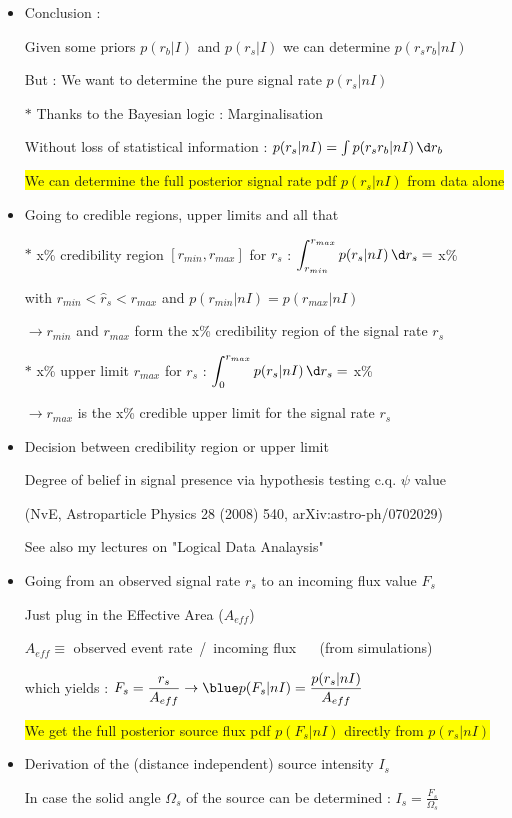 \Tr
\begin{itemize}
\item Conclusion :
\item[] {\blue Given some priors $p(r_{b}|I)$ and $p(r_{s}|I)$ we can determine $p(r_{s}r_{b}|nI)$}
\item[] But : {\red We want to determine the pure signal rate $p(r_{s}|nI)$}
\item[$\ast$] Thanks to the Bayesian logic : {\blue Marginalisation}
\item[] Without loss of statistical information : {\blue $p(r_{s}|nI)=\int p(r_{s}r_{b}|nI)\,\d r_{b}$}
\item[] \colorbox{yellow}{We can determine the full posterior signal rate pdf $p(r_{s}|nI)$ from data alone}
\item {\blue Going to credible regions, upper limits and all that}
\item[$\ast$] x\% credibility region $[r_{min},r_{max}]$ for $r_{s}$ : $\displaystyle \int_{r_{min}}^{r_{max}} p(r_{s}|nI)\,\d r_{s}=$ x\%
\item[] with $r_{min} < \hat{r}_{s} < r_{max}$ and $p(r_{min}|nI)=p(r_{max}|nI)$ 
\item[] $\rightarrow r_{min}$ and $r_{max}$ form the x\% credibility region of the signal rate $r_{s}$
\item[$\ast$] x\% upper limit $r_{max}$ for $r_{s}$ : $\displaystyle \int_{0}^{r_{max}} p(r_{s}|nI)\,\d r_{s}=$ x\%
\item[] $\rightarrow r_{max}$ is the x\% credible upper limit for the signal rate $r_{s}$
\end{itemize}

\Tr
\begin{itemize}
\item {\blue Decision between credibility region or upper limit}
\item[] Degree of belief in signal presence via hypothesis testing c.q. $\psi$ value
\item[] (NvE, Astroparticle Physics 28 (2008) 540, arXiv:astro-ph/0702029)
\item[] See also my lectures on "Logical Data Analaysis" 
\item {\blue Going from an observed signal rate $r_{s}$ to an incoming flux value $F_{s}$}
\item[] Just plug in the {\red Effective Area} ($A_{eff}$)
\item[] $A_{eff} \equiv$ observed event rate~/~incoming flux $\quad$ (from simulations)
\item[] which yields : $\displaystyle F_{s}=\frac{r_{s}}{A_{eff}}
        \rightarrow {\blue p(F_{s}|nI)=\frac{p(r_{s}|nI)}{A_{eff}}}$
\item[] \colorbox{yellow}{We get the full posterior source flux pdf $p(F_{s}|nI)$ directly from $p(r_{s}|nI)$}
\item {\blue Derivation of the (distance independent) source intensity $I_{s}$}
\item[] In case the solid angle $\Omega_{s}$ of the source can be determined :
        $\displaystyle I_{s}=\frac{F_{s}}{\Omega_{s}}$ 
\end{itemize}
